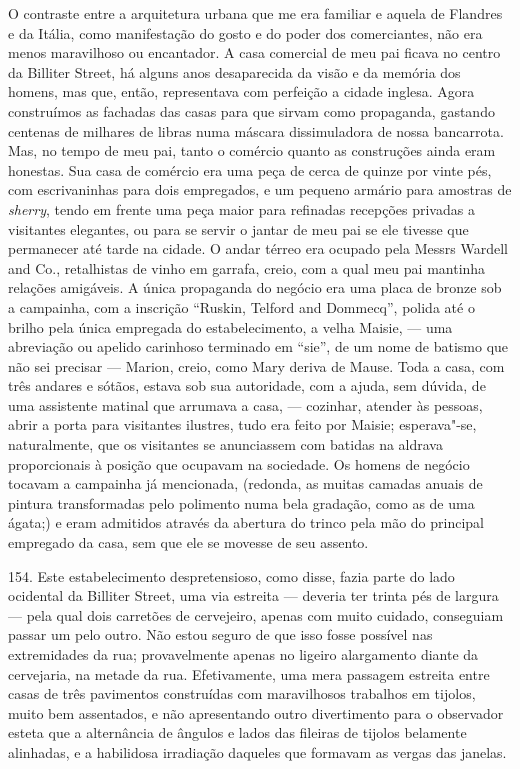 O contraste entre a arquitetura urbana que me era familiar e aquela de
Flandres e da Itália, como manifestação do gosto e do poder dos
comerciantes, não era menos maravilhoso ou encantador. A casa comercial
de meu pai ficava no centro da Billiter Street, há alguns anos
desaparecida da visão e da memória dos homens, mas que, então,
representava com perfeição a cidade inglesa. Agora construímos as
fachadas das casas para que sirvam como propaganda, gastando centenas de
milhares de libras numa máscara dissimuladora de nossa bancarrota. Mas,
no tempo de meu pai, tanto o comércio quanto as construções ainda eram
honestas. Sua casa de comércio era uma peça de cerca de quinze por vinte
pés, com escrivaninhas para dois empregados, e um pequeno armário para
amostras de \emph{sherry}, tendo em frente uma peça maior para refinadas
recepções privadas a visitantes elegantes, ou para se servir o jantar de
meu pai se ele tivesse que permanecer até tarde na cidade. O andar
térreo era ocupado pela Messrs Wardell and Co., retalhistas de vinho em
garrafa, creio, com a qual meu pai mantinha relações amigáveis. A única
propaganda do negócio era uma placa de bronze sob a campainha, com a
inscrição ``Ruskin, Telford and Dommecq'', polida até o brilho pela
única empregada do estabelecimento, a velha Maisie, --- uma abreviação ou
apelido carinhoso terminado em ``sie'', de um nome de batismo que não
sei precisar --- Marion, creio, como Mary deriva de Mause. Toda a casa,
com três andares e sótãos, estava sob sua autoridade, com a ajuda, sem
dúvida, de uma assistente matinal que arrumava a casa, --- cozinhar,
atender às pessoas, abrir a porta para visitantes ilustres, tudo era
feito por Maisie; esperava"-se, naturalmente, que os visitantes se
anunciassem com batidas na aldrava proporcionais à posição que ocupavam
na sociedade. Os homens de negócio tocavam a campainha já mencionada,
(redonda, as muitas camadas anuais de pintura transformadas pelo
polimento numa bela gradação, como as de uma ágata;) e eram admitidos
através da abertura do trinco pela mão do principal empregado da casa,
sem que ele se movesse de seu assento.

154. Este estabelecimento despretensioso, como disse, fazia parte do
lado ocidental da Billiter Street, uma via estreita --- deveria ter
trinta pés de largura --- pela qual dois carretões de cervejeiro, apenas
com muito cuidado, conseguiam passar um pelo outro. Não estou seguro de
que isso fosse possível nas extremidades da rua; provavelmente apenas no
ligeiro alargamento diante da cervejaria, na metade da rua.
Efetivamente, uma mera passagem estreita entre casas de três pavimentos
construídas com maravilhosos trabalhos em tijolos, muito bem assentados,
e não apresentando outro divertimento para o observador esteta que a
alternância de ângulos e lados das fileiras de tijolos belamente
alinhadas, e a habilidosa irradiação daqueles que formavam as vergas das
janelas.

